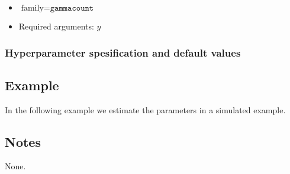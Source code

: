 \documentclass[a4paper,11pt]{article}
\begin{document}
\begin{itemize}
\item $\text{family}=\texttt{gammacount}$
\item Required arguments: $y$
\end{itemize}

\subsubsection*{Hyperparameter spesification and default values}



\subsection*{Example}

In the following example we estimate the parameters in a simulated
example.


\subsection*{Notes}

None.
\end{document}
